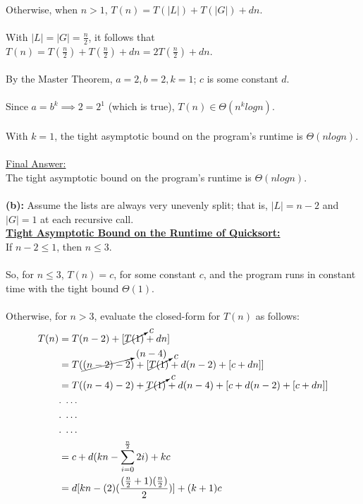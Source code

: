 \documentclass[12pt]{article}
\begin{document}
\\
Otherwise, when $n > 1$, $T(n) = T(|L|) + T(|G|) + dn$. \\
\\
With $|L| = |G| = \frac{n}{2}$, it follows that $T(n) = T(\frac{n}{2}) + T(\frac{n}{2}) + dn = 2T(\frac{n}{2}) + dn$. \\
\\
By the Master Theorem, $a = 2, b = 2, k = 1$; $c$ is some constant $d$. \\
\\
Since $a = b^k \implies 2 = 2^1$ (which is true), $T(n) \in \Theta (n^k logn)$. \\
\\
With $k = 1$, the tight asymptotic bound on the program's runtime is $\Theta (n logn)$. \\
\\
\underline{Final Answer:} \\
The tight asymptotic bound on the program's runtime is $\Theta (n logn)$. \\
\\
\textbf{(b):} Assume the lists are always very unevenly split; that is, \(|L| = n - 2\) and \(|G| = 1\) at each recursive call. \\
\textbf{\underline{Tight Asymptotic Bound on the Runtime of Quicksort:}} \\
If $n - 2 \leq 1$, then $n \leq 3$. \\
\\
So, for $n \leq 3$, $T(n) = c$, for some constant $c$, and the program runs in constant time with the tight bound $\Theta (1)$. \\
\\
Otherwise, for $n > 3$, evaluate the closed-form for $T(n)$ as follows:
\begin{equation*}
    \begin{aligned}
        T(n) &= T(n - 2) + [\cancelto{c}{T(1)} + dn] \\
        &= T(\cancelto{(n - 4)}{(n - 2) - 2}) + [\cancelto{c}{T(1)} + d(n - 2) + [c + dn]] \\
        &= T((n - 4) - 2) + \cancelto{c}{T(1)} + d(n - 4) + [c + d(n - 2) + [c + dn]] \\
        &. \; \dots \\
        &. \; \dots \\
        &. \; \dots \\
        &= c + d(kn - \sum_{i = 0}^{\frac{n}{2}} 2i) + kc \\
        &= d[kn - (2)(\frac{(\frac{n}{2} + 1)(\frac{n}{2})}{2})] + (k + 1)c
    \end{aligned}
\end{equation*}
\end{document}
